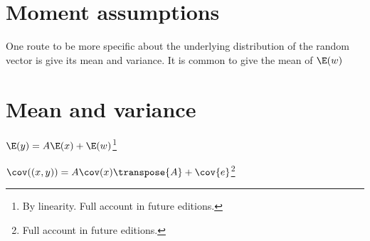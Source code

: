 \section*{Moment assumptions}

One route to be more specific about the underlying distribution of the random vector is give its mean and variance.
It is common to give the mean of $\E (w)$

\section*{Mean and variance}

\begin{proposition}
$\E (y) = A\E (x) + \E (w)$\footnote{By linearity. Full account in future editions.}\end{proposition}
\begin{proposition}
$\cov((x, y)) = A\cov(x)\transpose{A} + \cov{e}$\footnote{Full account in future editions.}\end{proposition}